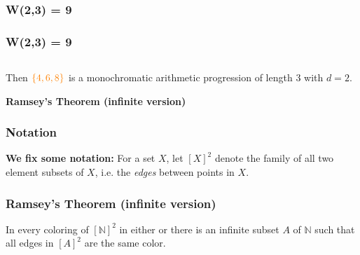 \documentclass{beamer}
\begin{document}
\begin{frame}
\frametitle{W(2,3) = 9}
\begin{center}
	\Huge {\color{orange}{1}}    {\color{cyan}{2}} {\color{orange}{3}}    {\color{orange}{4}}   {\color{cyan}{5}}    {\color{orange}{6}}   {\color{cyan}{7}}    {\color{orange}{8}}    {\color{cyan}{9}}
\end{center}
\end{frame}

\begin{frame}
\frametitle{W(2,3) = 9}
\begin{center}
	\Huge {\color{orange}{1}}    {\color{cyan}{2}} {\color{orange}{3}}    {\color{orange}{4}}   {\color{cyan}{5}}    {\color{orange}{6}}   {\color{cyan}{7}}    {\color{orange}{8}}    {\color{cyan}{9}}
\end{center}
$ $\newline

Then \( {\color{orange}{\{ 4, 6, 8 \}}} \) is a monochromatic arithmetic progression of length 3 with \( d = 2 \).
\end{frame}


\begin{frame}
\begin{center}
	\Large{\textbf{Ramsey's Theorem (infinite version)}}
\end{center}
\end{frame}

\begin{frame}
\frametitle{Notation} \textbf{We fix some notation:} For a set \( X \), let \( [X]^{2} \) denote the family of all two element subsets of \( X \), i.e. the \emph{edges} between points in \( X \).
\end{frame}

\begin{frame}
	\frametitle{Ramsey's Theorem (infinite version)} In every coloring of \( [\mathbb{N}]^{2}  \) in either {\color{red}{red}} or {\color{blue}{blue}} there is an infinite subset \( A \) of \( \mathbb{N} \) such that all edges in \( [A]^{2}  \) are the same color.
\end{frame}
\end{document}
